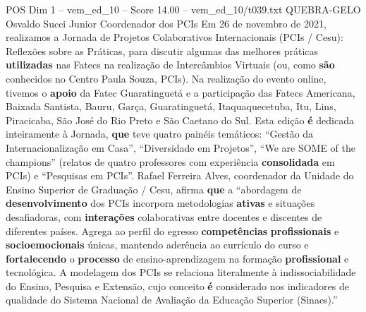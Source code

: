\begin{textsample}{POS Dim 1 – vem\_ed\_10 – Score 14.00 – vem\_ed\_10/t039.txt}  \label{ex:f1_pos_118}
QUEBRA-GELO Osvaldo Succi Junior Coordenador dos PCIs Em 26 de novembro de 2021, realizamos a Jornada de Projetos Colaborativos Internacionais (PCIs / Cesu): Reflexões sobre as Práticas, para discutir algumas das melhores práticas \textbf{utilizadas} nas Fatecs na realização de Intercâmbios Virtuais (ou, como \textbf{são} conhecidos no Centro Paula Souza, PCIs).
Na realização do evento online, tivemos o \textbf{apoio} da Fatec Guaratinguetá e a participação das Fatecs Americana, Baixada Santista, Bauru, Garça, Guaratinguetá, Itaquaquecetuba, Itu, Lins, Piracicaba, São José do Rio Preto e São Caetano do Sul.
Esta edição \textbf{é} dedicada inteiramente à Jornada, \textbf{que} teve quatro painéis temáticos: “Gestão da Internacionalização em Casa”, “Diversidade em Projetos”, “We are SOME of the champions” (relatos de quatro professores com experiência \textbf{consolidada} em PCIs) e “Pesquisas em PCIs”.
Rafael Ferreira Alves, coordenador da Unidade do Ensino Superior de Graduação / Cesu, afirma \textbf{que} a “abordagem de \textbf{desenvolvimento} dos PCIs incorpora metodologias \textbf{ativas} e situações desafiadoras, com \textbf{interações} colaborativas entre docentes e discentes de diferentes países.
Agrega ao perfil do egresso \textbf{competências} \textbf{profissionais} e \textbf{socioemocionais} únicas, mantendo aderência ao currículo do curso e \textbf{fortalecendo} o \textbf{processo} de ensino-aprendizagem na formação \textbf{profissional} e tecnológica.
A modelagem dos PCIs se relaciona literalmente à indissociabilidade do Ensino, Pesquisa e Extensão, cujo conceito \textbf{é} considerado nos indicadores de qualidade do Sistema Nacional de Avaliação da Educação Superior (Sinaes).”

\end{textsample}
